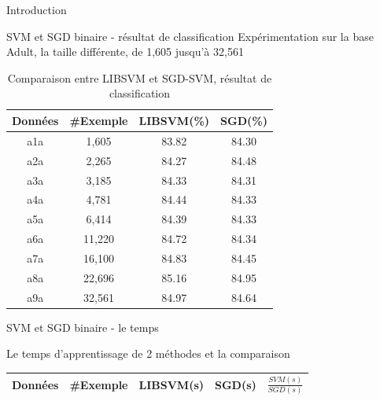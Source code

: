 \documentclass[11pt]{beamer}
\begin{document}
\begin{otherlanguage}{french}
\begin{frame}{Introduction}
\end{frame}

\begin{frame}{SVM et SGD binaire - résultat de classification}
Expérimentation sur la base Adult, la taille différente, de 1,605 jusqu'à 32,561

\begin{table}
\begin{center}
    \begin{tabular}{ | c | c | c | c |}
    \hline
    Données & \#Exemple & LIBSVM(\%) & SGD(\%) \\ \hline
    
    a1a & 1,605 & 83.82 & 84.30 \\ \hline
    
    a2a & 2,265 & 84.27 & 84.48 \\ \hline
    
    a3a & 3,185 & 84.33 & 84.31 \\ \hline
    
    a4a & 4,781 & 84.44 & 84.33 \\ \hline
    
    a5a & 6,414 & 84.39 & 84.33 \\ \hline
    
    a6a & 11,220 & 84.72 & 84.34 \\ \hline
    
    a7a & 16,100 & 84.83 & 84.45 \\ \hline
    
    a8a & 22,696 & 85.16 & 84.95 \\ \hline
    
    a9a & 32,561 & 84.97 & 84.64 \\ \hline
    
    \end{tabular}
\end{center}
\caption{Comparaison entre LIBSVM et SGD-SVM, résultat de classification}
\label{tab:svmsgd}
\end{table}

\end{frame}

\begin{frame}{SVM et SGD binaire - le temps}

Le temps d'apprentissage de 2 méthodes et la comparaison

\begin{table}
\begin{center}
    \begin{tabular}{ | c | c | c | c | c |}
    \hline
    Données & \#Exemple & LIBSVM(s) & SGD(s) & $\frac{SVM(s)}{SGD(s)}$ \\ \hline
    

\end{tabular}
\end{center}
\end{table}
\end{frame}
\end{otherlanguage}
\end{document}
